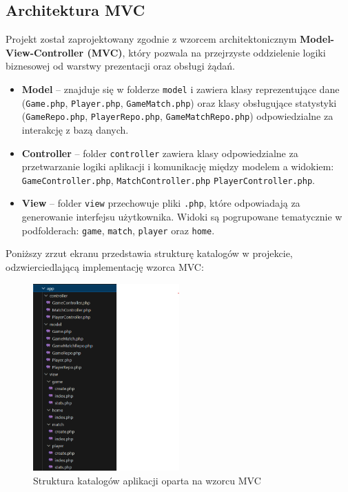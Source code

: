 \documentclass[12pt,a4paper]{article}
\begin{document}
\begin{enumerate}
\pagebreak
\section{Architektura MVC}

Projekt został zaprojektowany zgodnie z wzorcem architektonicznym \textbf{Model-View-Controller (MVC)}, który pozwala na przejrzyste oddzielenie logiki biznesowej od warstwy prezentacji oraz obsługi żądań.

\begin{itemize}
    \item \textbf{Model} -- znajduje się w folderze \texttt{model} i zawiera klasy reprezentujące dane (\texttt{Game.php}, \texttt{Player.php}, \texttt{GameMatch.php}) oraz klasy obsługujące statystyki (\texttt{GameRepo.php}, \texttt{PlayerRepo.php}, \texttt{GameMatchRepo.php}) odpowiedzialne za interakcję z bazą danych.
    \item \textbf{Controller} -- folder \texttt{controller} zawiera klasy odpowiedzialne za przetwarzanie logiki aplikacji i komunikację między modelem a widokiem: \texttt{GameController.php}, \texttt{MatchController.php} \texttt{PlayerController.php}.
    \item \textbf{View} -- folder \texttt{view} przechowuje pliki \texttt{.php}, które odpowiadają za generowanie interfejsu użytkownika. Widoki są pogrupowane tematycznie w podfolderach: \texttt{game}, \texttt{match}, \texttt{player} oraz \texttt{home}.
\end{itemize}

Poniższy zrzut ekranu przedstawia strukturę katalogów w projekcie, odzwierciedlającą implementację wzorca MVC:

\begin{figure}[H]
    \centering
    \includegraphics[width=0.5\textwidth]{media/mvc.png}
    \caption{Struktura katalogów aplikacji oparta na wzorcu MVC}
\end{figure}

\end{enumerate}
\end{document}
